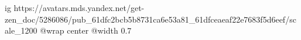  
 
 
 
 

\ifcmt
  ig https://avatars.mds.yandex.net/get-zen_doc/5286086/pub_61dfc2bcb5b8731ca6e53a81_61dfceaeaf22e7683f5d6eef/scale_1200
	@wrap center
	@width 0.7
\fi
